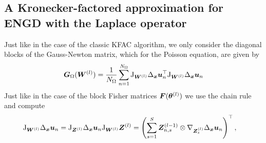 
\subsection{A Kronecker-factored approximation for ENGD with the Laplace operator}

Just like in the case of the classic KFAC algorithm, we only consider the diagonal blocks of the Gauss-Newton matrix, which for the Poisson equation, are given by
\begin{align}
    {\bm{G}}_\Omega({\bm{W}}^{(l)}) = \frac1{{N_\Omega}} \sum_{n=1}^{N_\Omega} \mathrm{J}_{{\bm{W}}^{(l)}} \Delta_{\bm{x}} {\bm{u}}_n^\top \mathrm{J}_{{\bm{W}}^{(l)}} \Delta_{\bm{x}} {\bm{u}}_n
\end{align}
Just like in the case of the block Fisher matrices ${\bm{F}}({\bm{\theta}}^{(l)})$ we use the chain rule and compute
\begin{align*}
    \jac_{\mW^{(l)}} \Delta_\vx \vu_n & = \jac_{\mZ^{(l)}}\Delta_\vx \vu_n \jac_{\mW^{(l)}} \mZ^{(l)} %
    = \left(\sum_{s=1}^S \mZ^{(l-1)}_{n,s} \otimes \nabla_{\mZ^{(l)}_s} \Delta_{\vx}\vu_n\right)^\top,
\end{align*}
